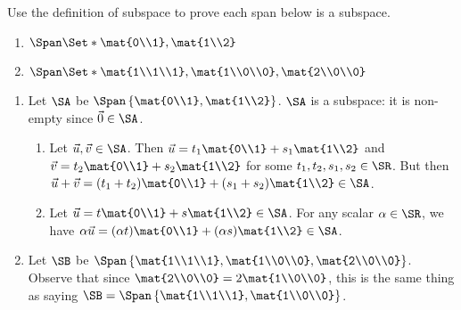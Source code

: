 \begin{exercises}
\begin{problist}
		\prob Use the definition of subspace to prove each span below is a subspace.
		\begin{enumerate}
			\item $\Span\Set*{\mat{0\\1}, \mat{1\\2}}$
			\item $\Span\Set*{\mat{1\\1\\1}, \mat{1\\0\\0}, \mat{2\\0\\0}}$
		\end{enumerate}
		\begin{solution}
			\begin{enumerate}
				\item Let $\SA$ be $\Span\left\{\mat{0\\1},\mat{1\\2}\right\}$. $\SA$ is a subspace: it is non-empty since $\vec 0\in\SA$. 
				\begin{enumerate}
					\item Let $\vec u,\vec v\in \SA$. Then $\vec u=t_1\mat{0\\1}+s_1\mat{1\\2}$ and $\vec v=t_2\mat{0\\1}+s_2\mat{1\\2}$ for some $t_1,t_2,s_1,s_2\in\SR$. But then $\vec u+\vec v=(t_1+t_2)\mat{0\\1}+(s_1+s_2)\mat{1\\2}\in \SA$.
					\item Let $\vec u=t\mat{0\\1}+s\mat{1\\2}\in\SA$. For any scalar $\alpha\in\SR$, we have $\alpha\vec u=(\alpha t)\mat{0\\1}+(\alpha s)\mat{1\\2}\in\SA$.
				\end{enumerate}

				\item Let $\SB$ be $\Span\left\{\mat{1\\1\\1},\mat{1\\0\\0},\mat{2\\0\\0}\right\}$. Observe that since $\mat{2\\0\\0}=2\mat{1\\0\\0}$, this is the same thing as saying $\SB=\Span\left\{\mat{1\\1\\1},\mat{1\\0\\0}\right\}$.


\end{enumerate}
\end{solution}
\end{problist}
\end{exercises}
